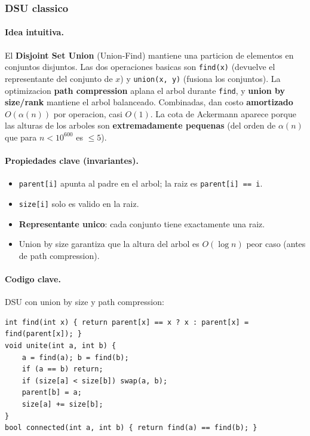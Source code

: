 ﻿\subsubsection{DSU classico}

\paragraph{Idea intuitiva.}
El \textbf{Disjoint Set Union} (Union-Find) mantiene una particion de elementos en conjuntos disjuntos. Las dos operaciones basicas son \texttt{find(x)} (devuelve el representante del conjunto de $x$) y \texttt{union(x, y)} (fusiona los conjuntos). La optimizacion \textbf{path compression} aplana el arbol durante \texttt{find}, y \textbf{union by size/rank} mantiene el arbol balanceado. Combinadas, dan costo \textbf{amortizado} $O(\alpha(n))$ por operacion, casi $O(1)$. La cota de Ackermann aparece porque las alturas de los arboles son \textbf{extremadamente pequenas} (del orden de $\alpha(n)$ que para $n < 10^{600}$ es $\le 5$).

\paragraph{Propiedades clave (invariantes).}
\begin{itemize}\setlength\itemsep{0pt}
	\item \texttt{parent[i]} apunta al padre en el arbol; la raiz es \texttt{parent[i] == i}.
	\item \texttt{size[i]} solo es valido en la raiz.
	\item \textbf{Representante unico}: cada conjunto tiene exactamente una raiz.
	\item Union by size garantiza que la altura del arbol es $O(\log n)$ peor caso (antes de path compression).
\end{itemize}

\paragraph{Codigo clave.}
DSU con union by size y path compression:
\begin{verbatim}
int find(int x) { return parent[x] == x ? x : parent[x] = find(parent[x]); }
void unite(int a, int b) {
    a = find(a); b = find(b);
    if (a == b) return;
    if (size[a] < size[b]) swap(a, b);
    parent[b] = a;
    size[a] += size[b];
}
bool connected(int a, int b) { return find(a) == find(b); }
\end{verbatim}


